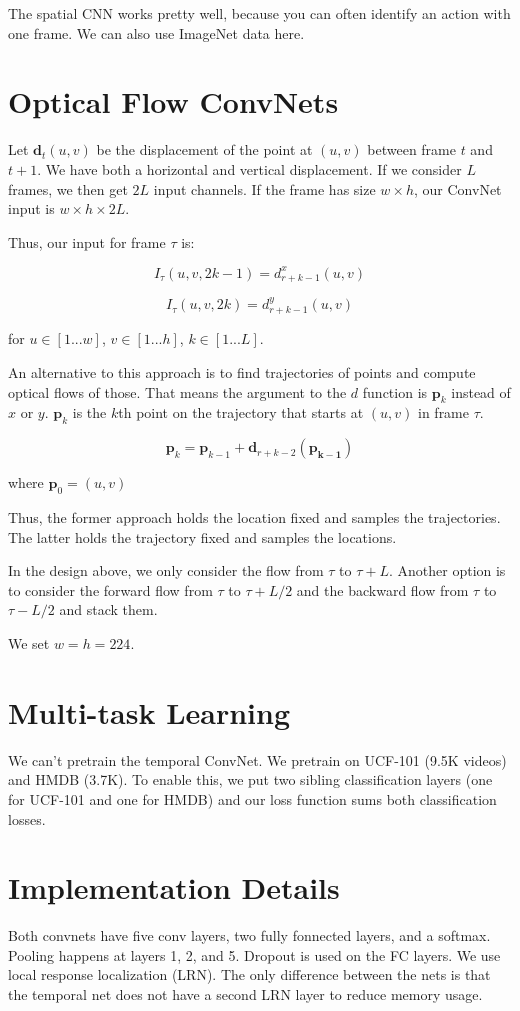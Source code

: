 \documentclass[a4paper]{article}
\begin{document}
The spatial CNN works pretty well, because you can often identify an action
with one frame. We can also use ImageNet data here.

\section{Optical Flow ConvNets}
Let $\mathbf{d}_t(u, v)$ be the displacement of the point at $(u, v)$ between 
frame $t$ and $t + 1$. We have both a horizontal and vertical displacement.
If we consider $L$ frames, we then get $2L$ input channels. If the frame has
size $w \times h$, our ConvNet input is $w \times h \times 2L$.

Thus, our input for frame $\tau$ is:

$$
I_{\tau}(u, v, 2k - 1) = d_{r + k - 1}^{x}(u, v)
$$

$$
I_{\tau}(u, v, 2k) = d_{r + k - 1}^{y}(u, v)
$$

for $u \in [1...w]$, $v \in [1...h]$, $k \in [1...L]$.

An alternative to this approach is to find trajectories of points and compute
optical flows of those. That means the argument to the $d$ function is 
$\mathbf{p}_k$ instead of $x$ or $y$. $\mathbf{p}_k$ is the $k$th point on the
trajectory that starts at $(u, v)$ in frame $\tau$.

$$
\mathbf{p}_k = \mathbf{p}_{k-1} + \mathbf{d}_{r + k - 2}(\mathbf{p_{k-1}})
$$

where $\mathbf{p}_0 = (u, v)$

Thus, the former approach holds the location fixed and samples the trajectories.
The latter holds the trajectory fixed and samples the locations.

In the design above, we only consider the flow from $\tau$ to $\tau + L$.
Another option is to consider the forward flow from $\tau$ to $\tau + L/2$
and the backward flow from $\tau$ to $\tau - L/2$ and stack them.

We set $w = h = 224$.

\section{Multi-task Learning}
We can't pretrain the temporal ConvNet. We pretrain on UCF-101 (9.5K videos)
and HMDB (3.7K). To enable this, we put two sibling classification layers (one
for UCF-101 and one for HMDB) and our loss function sums both classification
losses.

\section{Implementation Details}
Both convnets have five conv layers, two fully fonnected layers, and a softmax.
Pooling happens at layers 1, 2, and 5. Dropout is used on the FC layers. We
use local response localization (LRN). The only difference between the nets is
that the temporal net does not have a second LRN layer to reduce memory usage.
\end{document}

